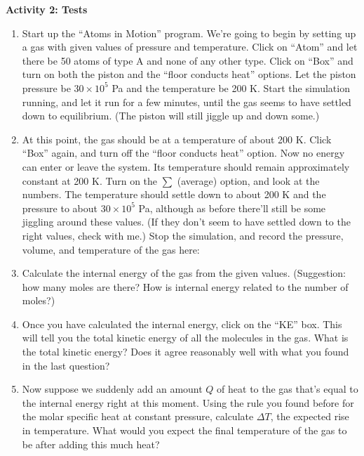 \textbf{Activity 2: Tests}

\begin{enumerate}[labparts]

\item Start up the ``Atoms in Motion'' program.  We're going to begin
by setting up a gas with given values of pressure and temperature.
Click on ``Atom''
and let there be 50 atoms of type A and none of any other type.
Click on ``Box'' and turn on both the piston and the ``floor conducts
heat'' options.  Let the piston pressure be $30\times 10^5$ Pa and
the temperature be 200 K.  Start the simulation running, and let it
run for a few minutes, until the gas seems to have settled down
to equilibrium.  (The piston will still jiggle up and down some.)

\item At this point, the gas should be at a temperature of about 200 K.
Click ``Box'' again, and turn off the ``floor conducts heat'' option.
Now no energy can enter or leave the system.  Its temperature should remain
approximately constant at 200 K.  Turn on the $\sum$ (average) option,
and look at the numbers.  The temperature should settle down to about 200 K
and the pressure to about $30\times 10^5$ Pa,
although as before there'll still be some jiggling around these values.  
(If they don't seem to have settled down to the right values, check with me.)
Stop the simulation, and 
record the pressure, volume, and temperature of the gas here:

\answerspace{1in}

\item Calculate the internal energy of the gas from the given values.  
(Suggestion: how many moles are there?  How is internal energy related
to the number of moles?)

\answerspace{1.5in}

\pagebreak[3]
\item Once you have calculated the internal energy, click on the ``KE''
box.  This will tell you the total kinetic energy of all the molecules
in the gas.  What is the total kinetic energy?  
Does it agree reasonably well with what you found in the last question?
\label{ke}

\answerspace{1in}

\item Now suppose we suddenly add an amount $Q$ of heat to the gas that's
equal to the internal energy right at this moment.  Using the rule you
found before for the molar specific heat at constant pressure, calculate
$\Delta T$, the expected rise in temperature.  What would you expect the
final temperature of the gas to be after adding this much heat?


\end{enumerate}
